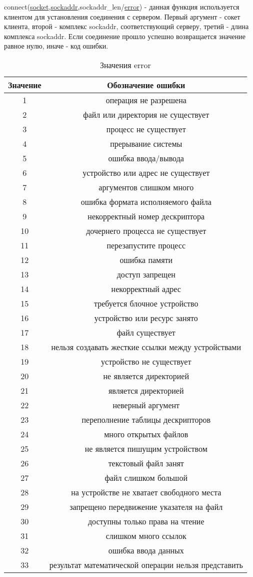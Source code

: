 \documentclass[12t]{article}
\begin{document}
\label{connect}
connect(\hyperref[socket]{socket},\hyperref[sockaddr]{sockaddr},sockaddr\_len/\hyperref[error]{error}) - данная функция используется клиентом для установления соединения с сервером. Первый аргумент - сокет клиента, второй - комплекс sockaddr, соответствующий серверу, третий - длина комплекса sockaddr. Если соединение прошло успешно возвращается значение равное нулю, иначе - код ошибки.

\begin{center}
\begin{longtable}{|c|c|}
\caption{\label{error}Значения error}
\\ \hline
Значение & Обозначение ошибки \\
\hline
1 & операция не разрешена \\
2 & файл или директория не существует \\
3 & процесс не существует \\
4 & прерывание системы \\
5 & ошибка ввода/вывода \\
6 & устройство или адрес не существует \\
7 & аргументов слишком много \\
8 & ошибка формата исполняемого файла \\
9 & некорректный номер дескриптора \\
10 & дочернего процесса не существует \\
11 & перезапустите процесс \\
12 & ошибка памяти \\
13 & доступ запрещен \\
14 & некорректный адрес \\
15 & требуется блочное устройство \\
16 & устройство или ресурс занято\\
17 & файл существует\\
18 & нельзя создавать жесткие ссылки между устройствами\\
19 & устройство не существует\\
20 & не является директорией\\ 
21 & является директорией\\
22 & неверный аргумент \\
23 & переполнение таблицы дескрипторов \\
24 & много открытых файлов \\
25 & не является пишущим устройством\\
26 & текстовый файл занят\\
27 & файл слишком большой \\
28 & на устройстве не хватает свободного места \\
29 & запрещено передвижение указателя на файл\\
30 & доступны только права на чтение\\
31 & слишком много ссылок\\
32 & ошибка ввода данных\\
33 & результат математической операции нельзя представить\\
\hline
\end{longtable}
\end{center}
\end{document}
